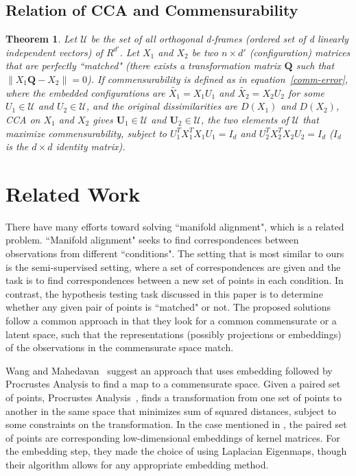 \documentclass[11pt]{article} %
\newtheorem{thm}{Theorem}
\begin{document}
\subsection{Relation of CCA and Commensurability} 

\begin{thm}
Let $ \mathcal{U}$ be the set of all orthogonal d-frames 
(ordered set of d linearly independent vectors) of $R^{d'}$. 
Let $X_1$ and $X_2$  be two $n\times d'$ (configuration) matrices that are perfectly ``matched"
 (there exists a transformation matrix $\mathbf{Q}$ such that $\|   X_1\mathbf{Q}  -X_2 \|=0$).
If commensurability is  defined as
in equation~\eqref{comm-error},
 where  the embedded configurations are $\tilde{X_1}=X_1U_1$ and $\tilde{X_2}=X_2U_2$ for some  $U_1\in \mathcal{U}$ and $U_2\in  \mathcal{U}$,
and   the original dissimilarities are $D(X_1)$ and $D(X_2) $,
 CCA on $X_1$ and $X_2$ gives $\mathbf{U}_1\in\mathcal{U}$ and  $\mathbf{U}_2\in\mathcal{U}$, 
 the two elements of $\mathcal{U}$ that maximize commensurability, subject to $U_1^{T}X_1^{T}X_1U_1=I_d$ and $U_2^{T}X_2^{T}X_2U_2=I_d$ ($I_d$ is the $d \times d$ identity matrix).
\end{thm}



\section{Related Work \label{sec:RelatedWork}}
There have many efforts toward solving ``manifold alignment", which is a related  problem. ``Manifold alignment" seeks to find correspondences between observations from different ``conditions". The setting that is most similar to ours is the semi-supervised setting, where a set of correspondences are given and the task is to find correspondences between a new set of points in each condition. In contrast, the hypothesis testing task discussed in this paper is to determine whether any given pair of points is ``matched" or not. The proposed solutions follow a common approach in that they look for a common commensurate or a latent space, such that the representations (possibly projections or embeddings) of the observations in the commensurate space match.

Wang and Mahedavan~\cite{Wang2008} suggest an  approach that uses embedding followed by Procrustes Analysis to find a map to a commensurate space. Given a paired set of points, Procrustes Analysis~\cite{Sibson}, finds a transformation from one set of points to another in the same space that minimizes sum of squared distances, subject to some constraints on the transformation. In the case mentioned in \cite{Wang2008}, the paired set of points are corresponding low-dimensional embeddings of kernel matrices.   For the embedding step, they made the choice of using Laplacian Eigenmaps, though their algorithm allows for any appropriate embedding method.
\end{document}
